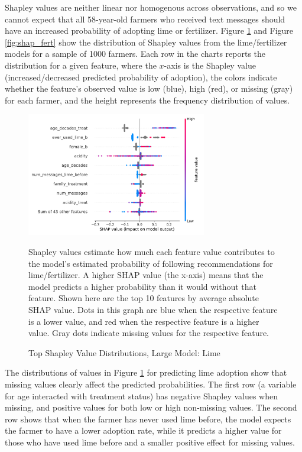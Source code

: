 \documentclass[12pt]{article}
\begin{document}
Shapley values are neither linear nor homogenous across observations, and so we cannot expect that all 58-year-old farmers who received text messages should have an increased probability of adopting lime or fertilizer. Figure \ref{fig:shap_lime} and Figure \ref{fig:shap_fert} show the distribution of Shapley values from the lime/fertilizer models for a sample of 1000 farmers. Each row in the charts reports the distribution for a given feature, where the $x$-axis is the Shapley value (increased/decreased predicted probability of adoption), the colors indicate whether the feature's observed value is low (blue), high (red), or missing (gray) for each farmer, and the height represents the frequency distribution of values.

\begin{figure}[H]
    \centering
    \caption{Top Shapley Value Distributions, Large Model: Lime}
    \includegraphics[width=0.7\textwidth]{../output/shap_beeswarm_lime.pdf}
    \begin{minipage}{0.7\textwidth}
    \tiny
    Shapley values estimate how much each feature value contributes to the model's estimated probability of following recommendations for lime/fertilizer. A higher SHAP value (the x-axis) means that the model predicts a higher probability than it would without that feature. Shown here are the top 10 features by average absolute SHAP value. Dots in this graph are blue when the respective feature is a lower value, and red when the respective feature is a higher value. Gray dots indicate missing values for the respective feature.
    \end{minipage}
    \label{fig:shap_lime}
\end{figure}

The distributions of values in Figure \ref{fig:shap_lime} for predicting lime adoption show that missing values clearly affect the predicted probabilities. The first row (a variable for age interacted with treatment status) has negative Shapley values when missing, and positive values for both low or high non-missing values. The second row shows that when the farmer has never used lime before, the model expects the farmer to have a lower adoption rate, while it predicts a higher value for those who have used lime before and a smaller positive effect for missing values.
\end{document}
